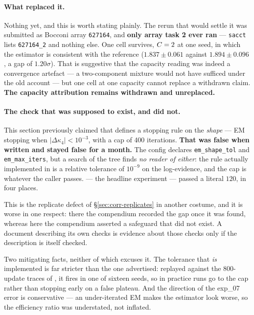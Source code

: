 \paragraph{What replaced it.} Nothing yet, and this is worth stating plainly. The rerun that
would settle it was submitted as Bocconi array \texttt{627164}, and \textbf{only array task 2
ever ran} --- \texttt{sacct} lists \texttt{627164\_2} and nothing else. One cell survives,
$C=2$ at one seed, in which the estimator is consistent with the reference
($1.837\pm0.061$ against $1.894\pm0.096$, a gap of $1.20\sigma$). That is suggestive that the
capacity reading was indeed a convergence artefact --- a two-component mixture would not have
sufficed under the old account --- but one cell at one capacity cannot replace a withdrawn
claim. \textbf{The capacity attribution remains withdrawn and unreplaced.}

\paragraph{The check that was supposed to exist, and did not.} This section previously claimed
that  defines a stopping rule on the \emph{shape} --- EM
stopping when $|\Delta\kappa_4| < 10^{-3}$, with a cap of 400 iterations. \textbf{That was false
when written and stayed false for a month.} The config declares \texttt{em\_shape\_tol} and
\texttt{em\_max\_iters}, but a search of the tree finds \emph{no reader of either}: the rule
actually implemented in  is a relative tolerance of $10^{-9}$ on the
log-evidence, and the cap is whatever the caller passes.  --- the headline
experiment --- passed a literal $120$, in four places.

This is the replicate defect of \S\ref{sec:corr-replicates} in another costume, and it is worse
in one respect: there the compendium recorded the gap once it was found, whereas here the
compendium asserted a safeguard that did not exist. A document describing its own checks is
evidence about those checks only if the description is itself checked.

Two mitigating facts, neither of which excuses it. The tolerance that \emph{is} implemented is far
stricter than the one advertised: replayed against the 800-update traces of
, it fires in one of sixteen seeds, so in practice runs go to the cap rather
than stopping early on a false plateau. And the direction of the exp\_07 error is conservative ---
an under-iterated EM makes the estimator look worse, so the efficiency ratio was understated, not
inflated.

